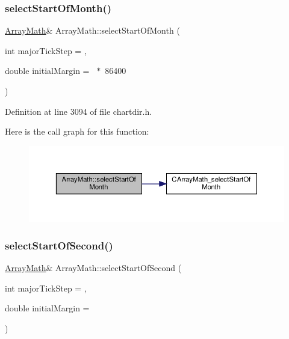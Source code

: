 \subsubsection{\texorpdfstring{select\+Start\+Of\+Month()}{selectStartOfMonth()}}
{\footnotesize\ttfamily \hyperlink{class_array_math}{Array\+Math}\& Array\+Math\+::select\+Start\+Of\+Month (\begin{DoxyParamCaption}\item[{int}]{major\+Tick\+Step = {},  }\item[{double}]{initial\+Margin = {~$\ast$~86400} }\end{DoxyParamCaption})\hspace{0.3cm}{\ttfamily [inline]}}



Definition at line 3094 of file chartdir.\+h.

Here is the call graph for this function\+:
\nopagebreak
\begin{figure}[H]
\begin{center}
\leavevmode
\includegraphics[width=350pt]{class_array_math_a65c725e8229a4cba8072af77b23e2286_cgraph}
\end{center}
\end{figure}
\mbox{\label{class_array_math_ab0253df48686370fccc34f3e286521d9}} 
\subsubsection{\texorpdfstring{select\+Start\+Of\+Second()}{selectStartOfSecond()}}
{\footnotesize\ttfamily \hyperlink{class_array_math}{Array\+Math}\& Array\+Math\+::select\+Start\+Of\+Second (\begin{DoxyParamCaption}\item[{int}]{major\+Tick\+Step = {},  }\item[{double}]{initial\+Margin = {} }\end{DoxyParamCaption})\hspace{0.3cm}{\ttfamily [inline]}}



